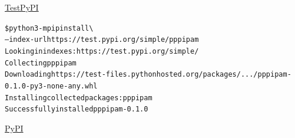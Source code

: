 \documentclass[11pt]{beamer}
\begin{document}

\begin{frame}[fragile]{\href{https://test.pypi.org/}{TestPyPI}}
  \hspace*{-.5cm}
\end{frame}

\begin{frame}[fragile]
\begin{alltt}\tiny
\$ python3 -m pip install \verb+\+
  --index-url https://test.pypi.org/simple/ pppipam
Looking in indexes: https://test.pypi.org/simple/
Collecting pppipam
  Downloading https://test-files.pythonhosted.org/packages/.../pppipam-0.1.0-py3-none-any.whl
Installing collected packages: pppipam
Successfully installed pppipam-0.1.0
\end{alltt}
\end{frame}

\begin{frame}[fragile]{\href{https://pypi.org/}{PyPI}}
  \hspace*{-.5cm}
\end{frame}
\end{document}
